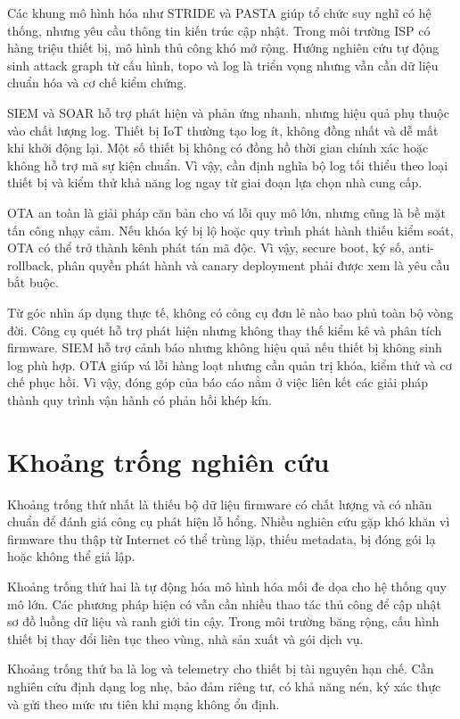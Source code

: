 \documentclass[../DoAn.tex]{subfiles}
\begin{document}
Các khung mô hình hóa như STRIDE và PASTA giúp tổ chức suy nghĩ có hệ thống, nhưng yêu cầu thông tin kiến trúc cập nhật. Trong môi trường ISP có hàng triệu thiết bị, mô hình thủ công khó mở rộng. Hướng nghiên cứu tự động sinh attack graph từ cấu hình, topo và log là triển vọng nhưng vẫn cần dữ liệu chuẩn hóa và cơ chế kiểm chứng.

SIEM và SOAR hỗ trợ phát hiện và phản ứng nhanh, nhưng hiệu quả phụ thuộc vào chất lượng log. Thiết bị IoT thường tạo log ít, không đồng nhất và dễ mất khi khởi động lại. Một số thiết bị không có đồng hồ thời gian chính xác hoặc không hỗ trợ mã sự kiện chuẩn. Vì vậy, cần định nghĩa bộ log tối thiểu theo loại thiết bị và kiểm thử khả năng log ngay từ giai đoạn lựa chọn nhà cung cấp.

OTA an toàn là giải pháp căn bản cho vá lỗi quy mô lớn, nhưng cũng là bề mặt tấn công nhạy cảm. Nếu khóa ký bị lộ hoặc quy trình phát hành thiếu kiểm soát, OTA có thể trở thành kênh phát tán mã độc. Vì vậy, secure boot, ký số, anti-rollback, phân quyền phát hành và canary deployment phải được xem là yêu cầu bắt buộc.

Từ góc nhìn áp dụng thực tế, không có công cụ đơn lẻ nào bao phủ toàn bộ vòng đời. Công cụ quét hỗ trợ phát hiện nhưng không thay thế kiểm kê và phân tích firmware. SIEM hỗ trợ cảnh báo nhưng không hiệu quả nếu thiết bị không sinh log phù hợp. OTA giúp vá lỗi hàng loạt nhưng cần quản trị khóa, kiểm thử và cơ chế phục hồi. Vì vậy, đóng góp của báo cáo nằm ở việc liên kết các giải pháp thành quy trình vận hành có phản hồi khép kín.

\section{Khoảng trống nghiên cứu}
Khoảng trống thứ nhất là thiếu bộ dữ liệu firmware có chất lượng và có nhãn chuẩn để đánh giá công cụ phát hiện lỗ hổng. Nhiều nghiên cứu gặp khó khăn vì firmware thu thập từ Internet có thể trùng lặp, thiếu metadata, bị đóng gói lạ hoặc không thể giả lập.

Khoảng trống thứ hai là tự động hóa mô hình hóa mối đe dọa cho hệ thống quy mô lớn. Các phương pháp hiện có vẫn cần nhiều thao tác thủ công để cập nhật sơ đồ luồng dữ liệu và ranh giới tin cậy. Trong môi trường băng rộng, cấu hình thiết bị thay đổi liên tục theo vùng, nhà sản xuất và gói dịch vụ.

Khoảng trống thứ ba là log và telemetry cho thiết bị tài nguyên hạn chế. Cần nghiên cứu định dạng log nhẹ, bảo đảm riêng tư, có khả năng nén, ký xác thực và gửi theo mức ưu tiên khi mạng không ổn định.
\end{document}
